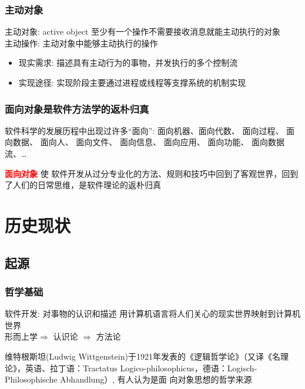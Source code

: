 \documentclass[compress]{beamer}
\begin{document}
\begin{frame}
  \frametitle{主动对象}
\begin{block}{主动对象: active object}
至少有一个操作不需要接收消息就能主动执行的对象\\
主动操作: 主动对象中能够主动执行的操作
\end{block}
\begin{itemize}
\item 现实需求: 描述具有主动行为的事物，并发执行的多个控制流
\item 实现途径: 实现阶段主要通过进程或线程等支撑系统的机制实现
\end{itemize}
\end{frame}

\begin{frame}
\frametitle{面向对象是软件方法学的返朴归真}
软件科学的发展历程中出现过许多“面向”: 面向机器、面向代数、
面向过程、 面向数据、 面向人、 面向文件、 面向信息、 面向应用、 
面向功能、 面向数据流、\ldots

\textcolor{red}{\textbf{面向对象}} 使
软件开发从过分专业化的方法、规则和技巧中回到了客观世界，回到了人们的日常思维，是软件理论的返朴归真

\end{frame}


\section{历史现状}

\subsection{起源}

\begin{frame}
\frametitle{哲学基础}
\begin{block}{软件开发: 对事物的认识和描述}
用计算机语言将人们关心的现实世界映射到计算机世界 \\
形而上学$\Longrightarrow$ 认识论 $\Longrightarrow$ 方法论
\end{block}

维特根斯坦(Ludwig Wittgenstein)于1921年发表的《逻辑哲学论》（又译《名理论》，英语、拉丁语：Tractatus
Logico-philosophicus，德语：Logisch-Philosophische Abhandlung）, 有人认为是面
向对象思想的哲学来源

\end{frame}
\end{document}
